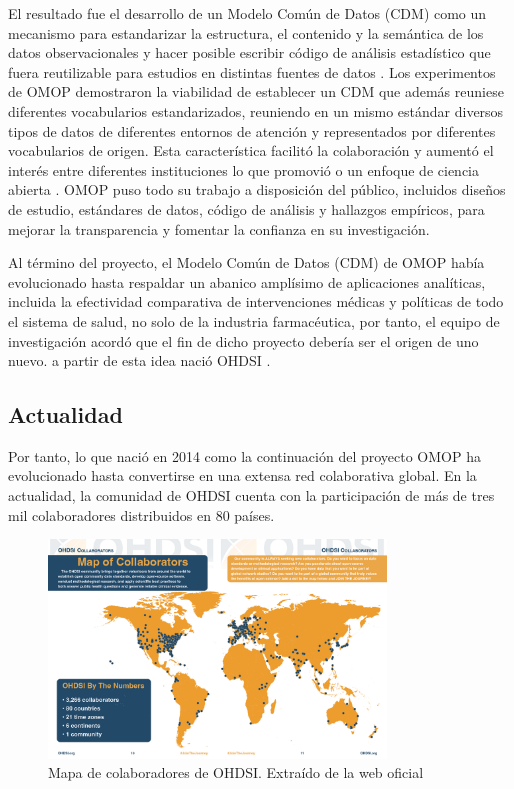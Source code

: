 El resultado fue el desarrollo de un Modelo Común de Datos (CDM) como un mecanismo para estandarizar la estructura, el contenido y la semántica de los datos observacionales y hacer posible escribir código de análisis estadístico que fuera reutilizable para estudios en distintas fuentes de datos \cite{overhage2012validation}. Los experimentos de OMOP demostraron la viabilidad de establecer un CDM que además reuniese diferentes vocabularios estandarizados, reuniendo en un mismo estándar diversos tipos de datos de diferentes entornos de atención y representados por diferentes vocabularios de origen. Esta característica facilitó la colaboración y aumentó el interés entre diferentes instituciones lo que promovió o un enfoque de ciencia abierta \cite{OHDSIbook}. OMOP puso todo su trabajo a disposición del público, incluidos diseños de estudio, estándares de datos, código de análisis y hallazgos empíricos, para mejorar la transparencia y fomentar la confianza en su investigación. 

Al término del proyecto, el Modelo Común de Datos (CDM) de OMOP había evolucionado hasta respaldar un abanico  amplísimo de aplicaciones analíticas, incluida la efectividad comparativa de intervenciones médicas y políticas de todo el sistema de salud, no solo de la industria farmacéutica, por tanto, el equipo de investigación acordó que el fin de dicho proyecto debería ser el origen de uno nuevo. a partir de esta idea nació OHDSI \cite{OHDSIbook}.

\subsection{Actualidad}

Por tanto, lo que nació en 2014 como la continuación del proyecto OMOP ha evolucionado hasta convertirse en una extensa red colaborativa global.  En la actualidad, la comunidad de OHDSI cuenta con la participación de más de tres mil colaboradores distribuidos en 80 países.

\begin{figure}[H]
    \centering
    \includegraphics[width=0.80\textwidth]{figures/OHDSIcollaborators.png}
     \caption{Mapa de colaboradores de OHDSI. Extraído de la web oficial \cite{OHDSIwebsite}}
    \label{fig:OHDSIcollaborators}
\end{figure}

